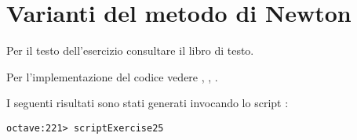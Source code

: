 \section{Varianti del metodo di Newton}
\label{sec:variantsMetodoDiNewton}

\begin{exercise}[2.5]
Per il testo dell'esercizio consultare il libro di testo.
\end{exercise}

Per l'implementazione del codice vedere ,
,
.

I seguenti risultati sono stati generati invocando lo script
:
\begin{lstlisting}
octave:221> scriptExercise25
\end{lstlisting}

